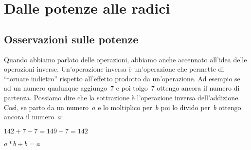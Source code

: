 














\section{Dalle potenze alle radici}
\label{sec:radicali_potenze_radici}

\subsection{Osservazioni sulle potenze}


Quando abbiamo parlato delle operazioni, abbiamo anche accennato all'idea
delle operazioni inverse. Un'operazione inversa è un'operazione che permette
di ``tornare indietro'' rispetto all'effetto prodotto da un'operazione.
Ad esempio se ad un numero qualunque aggiungo~7 e poi tolgo~7 ottengo ancora il
numero di partenza. Possiamo dire che la sottrazione è l'operazione inversa
dell'addizione. Così, se parto da un numero~$a$ e lo moltiplico per~$b$ poi lo
divido per~$b$ ottengo ancora il numero~$a$:

$142 + 7 - 7 = 149 -7 = 142$

$a * b \div b= a$

